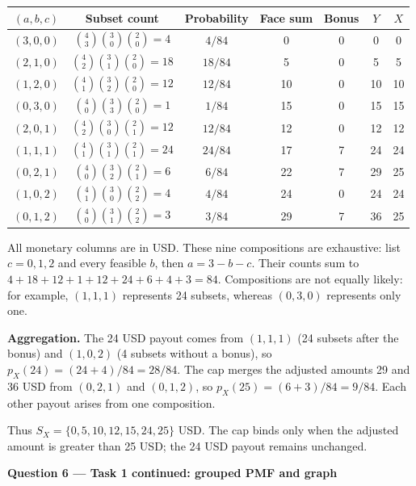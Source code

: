 \begin{center}
\begin{tabular}{ccccccc}\toprule
$(a,b,c)$ & Subset count & Probability & Face sum & Bonus & $Y$ & $X$\\\midrule
$(3,0,0)$ & $\binom4{3}\binom3{0}\binom2{0}=4$ & $4/84$ & 0 & 0 & 0 & 0\\
$(2,1,0)$ & $\binom4{2}\binom3{1}\binom2{0}=18$ & $18/84$ & 5 & 0 & 5 & 5\\
$(1,2,0)$ & $\binom4{1}\binom3{2}\binom2{0}=12$ & $12/84$ & 10 & 0 & 10 & 10\\
$(0,3,0)$ & $\binom4{0}\binom3{3}\binom2{0}=1$ & $1/84$ & 15 & 0 & 15 & 15\\
$(2,0,1)$ & $\binom4{2}\binom3{0}\binom2{1}=12$ & $12/84$ & 12 & 0 & 12 & 12\\
$(1,1,1)$ & $\binom4{1}\binom3{1}\binom2{1}=24$ & $24/84$ & 17 & 7 & 24 & 24\\
$(0,2,1)$ & $\binom4{0}\binom3{2}\binom2{1}=6$ & $6/84$ & 22 & 7 & 29 & 25\\
$(1,0,2)$ & $\binom4{1}\binom3{0}\binom2{2}=4$ & $4/84$ & 24 & 0 & 24 & 24\\
$(0,1,2)$ & $\binom4{0}\binom3{1}\binom2{2}=3$ & $3/84$ & 29 & 7 & 36 & 25\\
\bottomrule\end{tabular}
\end{center}


\endgroup

All monetary columns are in USD. These nine compositions are exhaustive: list $c=0,1,2$ and every feasible $b$, then $a=3-b-c$. Their counts sum to $4+18+12+1+12+24+6+4+3=84$. Compositions are not equally likely: for example, $(1,1,1)$ represents 24 subsets, whereas $(0,3,0)$ represents only one.

\textbf{Aggregation.} The 24 USD payout comes from $(1,1,1)$ (24 subsets after the bonus) and $(1,0,2)$ (4 subsets without a bonus), so $p_X(24)=(24+4)/84=28/84$. The cap merges the adjusted amounts 29 and 36 USD from $(0,2,1)$ and $(0,1,2)$, so $p_X(25)=(6+3)/84=9/84$. Each other payout arises from one composition.

Thus $S_X=\{0,5,10,12,15,24,25\}$ USD. The cap binds only when the adjusted amount is greater than 25 USD; the 24 USD payout remains unchanged.

\par\vspace{3mm}\secInicio[][sec:q6]

\clearpage\textbf{Question 6 --- Task 1 continued: grouped PMF and graph}

